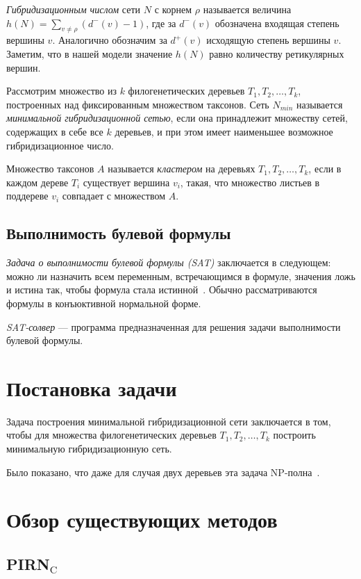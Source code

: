 \emph{Гибридизационным числом} сети $N$ с корнем $\rho$ называется величина $h(N) = \sum\limits_{v \ne \rho} (d^-(v) - 1)$, где за $d^-(v)$ обозначена входящая степень вершины $v$.
Аналогично обозначим за $d^+(v)$ исходящую степень вершины $v$.
Заметим, что в нашей модели значение $h(N)$ равно количеству ретикулярных вершин.

Рассмотрим множество из $k$ филогенетических деревьев $T_1, T_2, \dots, T_k$, построенных над фиксированным множеством таксонов.
Сеть $N_{min}$ называется \emph{минимальной гибридизационной сетью}, если она принадлежит множеству сетей, содержащих в себе все $k$ деревьев, и при этом имеет наименьшее возможное гибридизационное число.

Множество таксонов $A$ называется \emph{кластером} на деревьях $T_1, T_2, \dots, T_k$, если в каждом дереве $T_i$ существует вершина $v_i$, такая, что множество листьев в поддереве $v_i$ совпадает с множеством $A$.

\subsection{Выполнимость булевой формулы}

\emph{Задача о выполнимости булевой формулы (SAT)} заключается в следующем: можно ли назначить всем переменным, встречающимся в формуле, значения ложь и истина так, чтобы формула стала истинной~\cite{wiki:sat}. Обычно рассматриваются формулы в конъюктивной нормальной форме.

\emph{SAT-солвер} --- программа предназначенная для решения задачи выполнимости булевой формулы.

\FloatBarrier
\section{Постановка задачи}

Задача построения минимальной гибридизационной сети заключается в том, чтобы для множества филогенетических деревьев $T_1, T_2, \dots, T_k$ построить минимальную гибридизационную сеть.

Было показано, что даже для случая двух деревьев эта задача NP-полна~\cite {bordewich2007computing}.

\FloatBarrier
\section{Обзор существующих методов}

\subsection{PIRN$_\mathrm{C}$}


